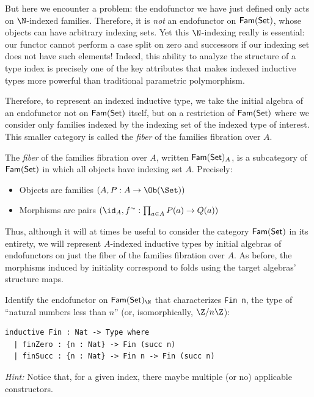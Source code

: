 But here we encounter a problem: the endofunctor we have just defined only acts on $\N$-indexed
families. Therefore, it is \emph{not} an endofunctor on $\mathsf{Fam}(\mathsf{Set})$, whose objects can have arbitrary
indexing sets. Yet this $\N$-indexing really is essential: our functor cannot perform a case split
on zero and successors if our indexing set does not have such elements! Indeed, this ability to
analyze the structure of a type index is precisely one of the key attributes that makes indexed
inductive types more powerful than traditional parametric polymorphism.

Therefore, to represent an indexed inductive type, we take the initial algebra of an endofunctor not
on $\mathsf{Fam}(\mathsf{Set})$ itself, but on a restriction of $\mathsf{Fam}(\mathsf{Set})$ where we consider only families indexed by
the indexing set of the indexed type of interest. This smaller category is called the \emph{fiber}
of the families fibration over $A$.

\begin{definition}
\sloppy
  The \emph{fiber} of the families fibration over $A$, written $\mathsf{Fam}(\mathsf{Set})_A$, is a subcategory of
  $\mathsf{Fam}(\mathsf{Set})$ in which all objects have indexing set $A$. Precisely:
  \begin{itemize}
    \item Objects are families $(A, P : A \to \Ob(\Set))$
    \item Morphisms are pairs $(\id_A, f^\sim : \prod_{a \in A} P(a) \to Q(a))$
  \end{itemize}
\end{definition}

Thus, although it will at times be useful to consider the category $\mathsf{Fam}(\mathsf{Set})$ in its entirety, we
will represent $A$-indexed inductive types by initial algebras of endofunctors on just the fiber of
the families fibration over $A$. As before, the morphisms induced by initiality correspond to folds
using the target algebras' structure maps.

\begin{exercise}
\sloppy
Identify the endofunctor on $\FamSet_\N$ that characterizes \texttt{Fin n}, the type of ``natural
numbers less than $n$'' (or, isomorphically, $\Z/n\Z$):
\begin{lstlisting}
inductive Fin : Nat -> Type where
  | finZero : {n : Nat} -> Fin (succ n)
  | finSucc : {n : Nat} -> Fin n -> Fin (succ n)
\end{lstlisting}

\emph{Hint:} Notice that, for a given index, there maybe multiple (or no) applicable constructors.
\end{exercise}

